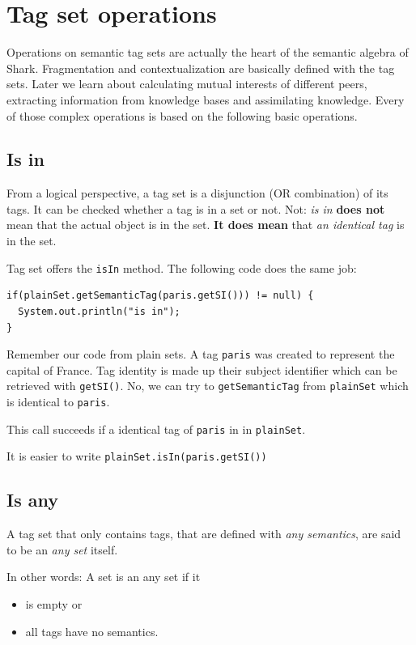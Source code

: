 \section{Tag set operations}
Operations on semantic tag sets are actually the heart of the semantic algebra of Shark. Fragmentation and contextualization are basically defined with the tag sets. Later we learn about calculating mutual interests of different peers, extracting information from knowledge bases and assimilating knowledge. Every of those complex operations is based on the following basic operations.

\subsection{Is in}
From a logical perspective, a tag set is a disjunction (OR combination) of its tags. It can be checked whether a tag is in a set or not. Not: {\it is in} {\bf does not} mean that the actual object is in the set. {\bf It does mean} that {\it an identical tag} is in the set.

Tag set offers the {\tt isIn} method. The following code does the same job:

\begin{verbatim}
if(plainSet.getSemanticTag(paris.getSI())) != null) {
  System.out.println("is in");
}
\end{verbatim}

Remember our code from plain sets. A tag {\tt paris} was created to represent the capital of France. Tag identity is made up their subject identifier which can be retrieved with {\tt getSI()}. No, we can try to {\tt getSemanticTag} from {\tt plainSet} which is identical to {\tt paris}.

This call succeeds if a identical tag of {\tt paris} in in {\tt plainSet}.

It is easier to write {\verb|plainSet.isIn(paris.getSI())|}

\subsection{Is any}
A tag set that only contains tags, that are defined with {\it any semantics}, are said to be an {\it any set} itself.

In other words: A set is an any set if it

\begin{itemize}
    \item is empty or
\item
all tags have no semantics.
\end{itemize}

